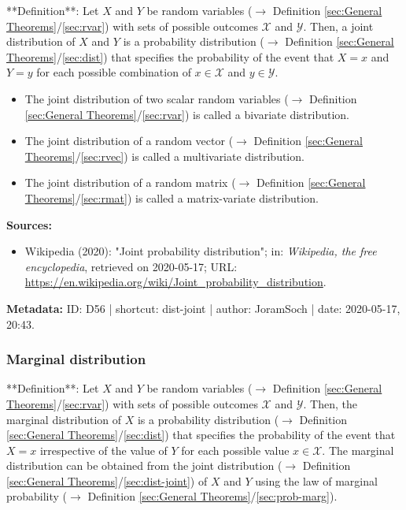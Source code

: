 \documentclass[a4paper,12pt,twoside]{book}
\begin{document}
**Definition**: Let $X$ and $Y$ be random variables ($\rightarrow$ Definition \ref{sec:General Theorems}/\ref{sec:rvar}) with sets of possible outcomes $\mathcal{X}$ and $\mathcal{Y}$. Then, a joint distribution of $X$ and $Y$ is a probability distribution ($\rightarrow$ Definition \ref{sec:General Theorems}/\ref{sec:dist}) that specifies the probability of the event that $X = x$ and $Y = y$ for each possible combination of $x \in \mathcal{X}$ and $y \in \mathcal{Y}$.

\begin{itemize}

\item The joint distribution of two scalar random variables ($\rightarrow$ Definition \ref{sec:General Theorems}/\ref{sec:rvar}) is called a bivariate distribution.

\item The joint distribution of a random vector ($\rightarrow$ Definition \ref{sec:General Theorems}/\ref{sec:rvec}) is called a multivariate distribution.

\item The joint distribution of a random matrix ($\rightarrow$ Definition \ref{sec:General Theorems}/\ref{sec:rmat}) is called a matrix-variate distribution.

\end{itemize}


\vspace{1em}
\textbf{Sources:}
\begin{itemize}
\item Wikipedia (2020): "Joint probability distribution"; in: \textit{Wikipedia, the free encyclopedia}, retrieved on 2020-05-17; URL: \url{https://en.wikipedia.org/wiki/Joint_probability_distribution}.
\end{itemize}


\vspace{1em}
\textbf{Metadata:} ID: D56 | shortcut: dist-joint | author: JoramSoch | date: 2020-05-17, 20:43.
\vspace{1em}



\subsubsection[\textit{Marginal distribution}]{Marginal distribution} \label{sec:dist-marg}
\setcounter{equation}{0}

**Definition**: Let $X$ and $Y$ be random variables ($\rightarrow$ Definition \ref{sec:General Theorems}/\ref{sec:rvar}) with sets of possible outcomes $\mathcal{X}$ and $\mathcal{Y}$. Then, the marginal distribution of $X$ is a probability distribution ($\rightarrow$ Definition \ref{sec:General Theorems}/\ref{sec:dist}) that specifies the probability of the event that $X = x$ irrespective of the value of $Y$ for each possible value $x \in \mathcal{X}$. The marginal distribution can be obtained from the joint distribution ($\rightarrow$ Definition \ref{sec:General Theorems}/\ref{sec:dist-joint}) of $X$ and $Y$ using the law of marginal probability ($\rightarrow$ Definition \ref{sec:General Theorems}/\ref{sec:prob-marg}).
\end{document}
